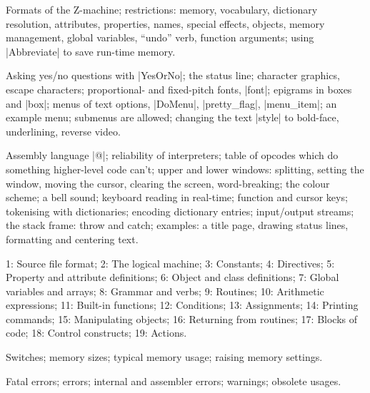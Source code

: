 %
Formats of the Z-machine; restrictions: memory, vocabulary, dictionary
resolution, attributes, properties, names, special effects, objects, memory
management, global variables, ``undo'' verb, function arguments; using
|Abbreviate| to save run-time memory.

%
Asking yes/no questions with |YesOrNo|; the status line; character graphics,
escape characters; proportional- and fixed-pitch fonts, |font|; epigrams in
boxes and |box|; menus of text options, |DoMenu|, |pretty_flag|,
|menu_item|; an example menu; submenus are allowed; changing the text
|style| to bold-face, underlining, reverse video.

%
Assembly language |@|; reliability of interpreters; table of opcodes
which do something higher-level code can't; upper and lower windows:
splitting, setting the window, moving the cursor, clearing the screen,
word-breaking; the colour scheme; a bell sound; keyboard reading in
real-time; function and cursor keys; tokenising with dictionaries;
encoding dictionary entries; input/output streams; the stack frame:
throw and catch; examples: a title page, drawing status lines,
formatting and centering text.


%
1: Source file format; 2: The logical machine; 3: Constants; 4: Directives;
5: Property and attribute definitions; 6: Object and class definitions;
7: Global variables and arrays; 8: Grammar and verbs; 9: Routines;
10: Arithmetic expressions; 11: Built-in functions; 12: Conditions;
13: Assignments; 14: Printing commands; 15: Manipulating objects;
16: Returning from routines; 17: Blocks of code; 18: Control constructs;
19: Actions.

%

%
Switches; memory sizes; typical memory usage; raising memory settings.

%
Fatal errors; errors; internal and assembler errors; warnings; obsolete
usages.


%

%

